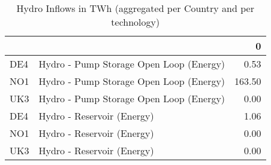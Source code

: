 \begin{table}
\centering
\caption{Hydro Inflows in TWh (aggregated per Country and per technology)}
\begin{tabular}{llr}
\toprule
    &                            &      0 \\
\midrule
DE4 & Hydro - Pump Storage Open Loop (Energy) &   0.53 \\
NO1 & Hydro - Pump Storage Open Loop (Energy) & 163.50 \\
UK3 & Hydro - Pump Storage Open Loop (Energy) &   0.00 \\
DE4 & Hydro - Reservoir (Energy) &   1.06 \\
NO1 & Hydro - Reservoir (Energy) &   0.00 \\
UK3 & Hydro - Reservoir (Energy) &   0.00 \\
\bottomrule
\end{tabular}
\end{table}
